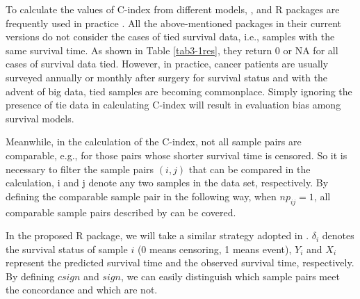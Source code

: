To calculate the values of C-index from different models, ,  and  R packages are frequently used in practice \citep{Harrell.1996, survcomp.2011, survival.2014, Hmisc.2019}. All the above-mentioned packages in their current versions do not consider the cases of tied survival data, i.e., samples with the same survival time. As shown in Table \ref{tab3-1res}, they return 0 or NA for all cases of survival data tied. However, in practice, cancer patients are usually surveyed annually or monthly after surgery for survival status and with the advent of big data, tied samples are becoming commonplace. Simply ignoring the presence of tie data in calculating C-index will result in evaluation bias among survival models.

Meanwhile, in the calculation of the C-index, not all sample pairs are comparable, e.g., for those pairs whose shorter survival time is censored. So it is necessary to filter the sample pairs $(i, j)$ that can be compared in the calculation, i and j denote any two samples in the data set, respectively. By defining the comparable sample pair in the following way, when $np_{ij} = 1$, all comparable sample pairs described by \cite{Ishwaran.2008} can be covered.

In the proposed R package, we will take a similar strategy adopted in \cite{Ishwaran.2008}. $\delta_i$ denotes the survival status of sample $i$ (0 means censoring, 1 means event), $Y_i$ and $X_i$ represent the predicted survival time and the observed survival time, respectively. By defining $csign$ and $sign$, we can easily distinguish which sample pairs meet the concordance and which are not.


